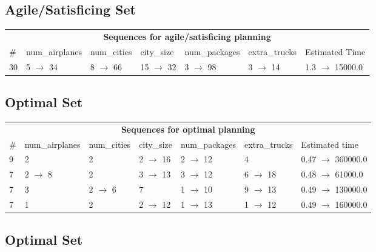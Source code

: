 \documentclass{article}
\begin{document}
                         \subsection*{Agile/Satisficing Set}

                        \begin{center}
                        \begin{tabular}{l|l|l|l|l|l|l}
                        \multicolumn{7}{c}{\bf \large Sequences for agile/satisficing planning}\\
                        \# & num\_airplanes & num\_cities & city\_size & num\_packages & extra\_trucks & Estimated Time\\\midrule
                        30&5 $\rightarrow$ 34&8 $\rightarrow$ 66&15 $\rightarrow$ 32&3 $\rightarrow$ 98&3 $\rightarrow$ 14&1.3 $\rightarrow$ 15000.0
                        \end{tabular}
                        \end{center}
                    
                            \subsection*{Optimal Set}

                            \begin{center}
                            \begin{tabular}{l|l|l|l|l|l|l}
                            \multicolumn{7}{c}{\bf \large Sequences for optimal planning}\\
                            \# & num\_airplanes & num\_cities & city\_size & num\_packages & extra\_trucks & Estimated time\\\midrule
                            9&2&2&2 $\rightarrow$ 16&2 $\rightarrow$ 12&4&0.47 $\rightarrow$ 360000.0\\
7&2 $\rightarrow$ 8&2&3 $\rightarrow$ 13&3 $\rightarrow$ 12&6 $\rightarrow$ 18&0.48 $\rightarrow$ 61000.0\\
7&3&2 $\rightarrow$ 6&7&1 $\rightarrow$ 10&9 $\rightarrow$ 13&0.49 $\rightarrow$ 130000.0\\
7&1&2&2 $\rightarrow$ 12&1 $\rightarrow$ 13&1 $\rightarrow$ 12&0.49 $\rightarrow$ 160000.0
                            \end{tabular}
                            \end{center}
                    
                                \subsection*{Optimal Set}
                                
\end{document}
